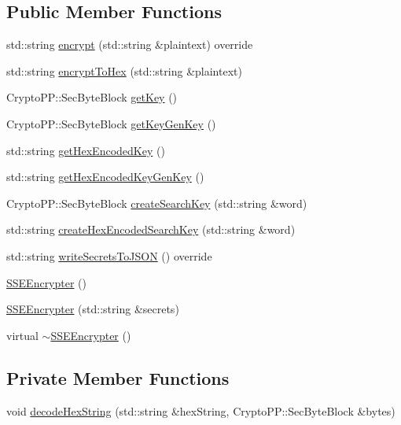 \subsection*{Public Member Functions}
\begin{DoxyCompactItemize}
\item 
std\+::string \hyperlink{classSSEEncrypter_ab13571d2a7a8875226bf8901cd080949}{encrypt} (std\+::string \&plaintext) override
\item 
std\+::string \hyperlink{classSSEEncrypter_a54465123beb996dc0410c8f8c4ec2ba6}{encrypt\+To\+Hex} (std\+::string \&plaintext)
\item 
Crypto\+P\+P\+::\+Sec\+Byte\+Block \hyperlink{classSSEEncrypter_ae9562054f00a5f9899b019568cad2338}{get\+Key} ()
\item 
Crypto\+P\+P\+::\+Sec\+Byte\+Block \hyperlink{classSSEEncrypter_a0fa90c40369bc916f61e870fd39a42c2}{get\+Key\+Gen\+Key} ()
\item 
std\+::string \hyperlink{classSSEEncrypter_a741ba1ef98a1f1b294ed3904738cd888}{get\+Hex\+Encoded\+Key} ()
\item 
std\+::string \hyperlink{classSSEEncrypter_abaefa48cff26cad49a17a1bd2586dbc7}{get\+Hex\+Encoded\+Key\+Gen\+Key} ()
\item 
Crypto\+P\+P\+::\+Sec\+Byte\+Block \hyperlink{classSSEEncrypter_ae81cc103149e1db15c577c8b474f9217}{create\+Search\+Key} (std\+::string \&word)
\item 
std\+::string \hyperlink{classSSEEncrypter_a09dac9d519550e0375f0f677aab69bfb}{create\+Hex\+Encoded\+Search\+Key} (std\+::string \&word)
\item 
std\+::string \hyperlink{classSSEEncrypter_a70e01b58fe0de0931cdb00ee97ee4af9}{write\+Secrets\+To\+J\+S\+ON} () override
\item 
\hyperlink{classSSEEncrypter_a4b45442fa1025d82ed499241da4796bf}{S\+S\+E\+Encrypter} ()
\item 
\hyperlink{classSSEEncrypter_ae109735e8bf9f5a32d6f481e6d208bd8}{S\+S\+E\+Encrypter} (std\+::string \&secrets)
\item 
virtual \hyperlink{classSSEEncrypter_a249d1527f2d370c693534c3d435a522a}{$\sim$\+S\+S\+E\+Encrypter} ()
\end{DoxyCompactItemize}
\subsection*{Private Member Functions}
\begin{DoxyCompactItemize}
\item 
void \hyperlink{classSSEEncrypter_a668394973e3f574ca24588c5a0763f5f}{decode\+Hex\+String} (std\+::string \&hex\+String, Crypto\+P\+P\+::\+Sec\+Byte\+Block \&bytes)
\end{DoxyCompactItemize}
